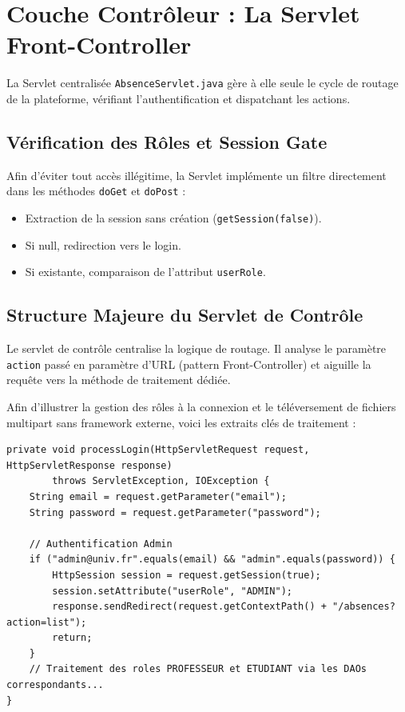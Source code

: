 \documentclass[12pt,a4paper]{article}
\begin{document}
\section{Couche Contrôleur : La Servlet Front-Controller}
La Servlet centralisée \texttt{AbsenceServlet.java} gère à elle seule le cycle de routage de la plateforme, vérifiant l'authentification et dispatchant les actions.

\subsection{Vérification des Rôles et Session Gate}
Afin d'éviter tout accès illégitime, la Servlet implémente un filtre directement dans les méthodes \texttt{doGet} et \texttt{doPost} :
\begin{itemize}
    \item Extraction de la session sans création (\texttt{getSession(false)}).
    \item Si null, redirection vers le login.
    \item Si existante, comparaison de l'attribut \texttt{userRole}.
\end{itemize}

\subsection{Structure Majeure du Servlet de Contrôle}
Le servlet de contrôle centralise la logique de routage. Il analyse le paramètre \texttt{action} passé en paramètre d'URL (pattern Front-Controller) et aiguille la requête vers la méthode de traitement dédiée.

Afin d'illustrer la gestion des rôles à la connexion et le téléversement de fichiers multipart sans framework externe, voici les extraits clés de traitement :

\begin{lstlisting}[caption={Extrait de l'authentification unifiée dans AbsenceServlet.java}]
private void processLogin(HttpServletRequest request, HttpServletResponse response) 
        throws ServletException, IOException {
    String email = request.getParameter("email");
    String password = request.getParameter("password");

    // Authentification Admin
    if ("admin@univ.fr".equals(email) && "admin".equals(password)) {
        HttpSession session = request.getSession(true);
        session.setAttribute("userRole", "ADMIN");
        response.sendRedirect(request.getContextPath() + "/absences?action=list");
        return;
    }
    // Traitement des roles PROFESSEUR et ETUDIANT via les DAOs correspondants...
}
\end{lstlisting}
\end{document}
